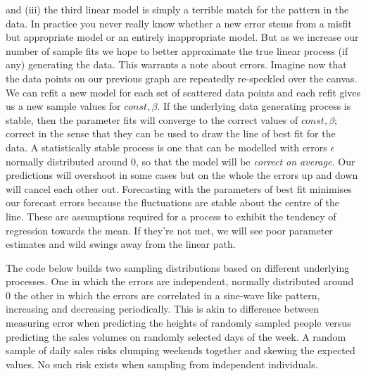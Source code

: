 \documentclass[10pt,a4paper,notitlepage, twocolumn]{article}
\begin{document}
and (iii) the third linear model is simply a terrible match for the pattern in the data. In practice you never really know whether a new error stems from a misfit but appropriate model or an entirely inappropriate model. But as we increase our number of sample fits we hope to better approximate the true linear process (if any) generating the data. This warrants a note about errors. Imagine now that the data points on our previous graph are repeatedly re-speckled over the canvas. We can refit a new model for each set of scattered data points and each refit gives us a new sample values for $ const, \beta$. If the underlying data generating process is stable, then the parameter fits will converge to the correct values of $const, \beta$; correct in the sense that they can be used to draw the line of best fit for the data. A statistically stable process is one that can be modelled with errors $\epsilon$ normally distributed around 0, so that the model will be \textit{ correct on average.} Our predictions will overshoot in some cases but on the whole the errors up and down will cancel each other out. Forecasting with the parameters of best fit minimises our forecast errors because the fluctuations are stable about the centre of the line. These are assumptions required for a process to exhibit the tendency of regression towards the mean. If they're not met, we will see poor parameter estimates and wild swings away from the linear path.
\newline

\noindent The code below builds two sampling distributions based on different underlying processes.  One in which the errors are independent, normally distributed around 0 the other in which the errors are correlated in a sine-wave like pattern, increasing and decreasing periodically. This is akin to difference between measuring error when predicting the heights of randomly sampled people versus predicting the sales volumes on randomly selected days of the week. A random sample of daily sales  risks clumping weekends together and skewing the expected values. No such risk exists when sampling from independent individuals. 
\end{document}
